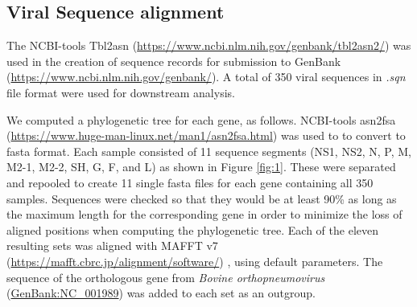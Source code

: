 \documentclass{article} %
\begin{document}
\subsection{Viral Sequence alignment}
The NCBI-tools Tbl2asn (\url{https://www.ncbi.nlm.nih.gov/genbank/tbl2asn2/})
was used in the creation of sequence records for submission to GenBank (\url{https://www.ncbi.nlm.nih.gov/genbank/}).
A total of 350 viral sequences in \textit{.sqn} file format were used for downstream analysis.

We computed a phylogenetic tree for each gene, as follows.
NCBI-tools asn2fsa (\url{https://www.huge-man-linux.net/man1/asn2fsa.html}) was used to to convert to fasta format.
Each sample consisted of 11 sequence segments
(NS1, NS2, N, P, M, M2-1, M2-2, SH, G, F, and L) as shown in 
Figure \ref{fig:1}.
These were separated and repooled to create 11 single fasta files for each gene containing all 350 samples. 
Sequences were checked so that they would be at least 90\% as long as the maximum length 
for the corresponding gene in order to minimize the loss of aligned positions when computing the phylogenetic tree. 
Each of the eleven resulting sets was aligned with MAFFT v7 (\url{https://mafft.cbrc.jp/alignment/software/})
\citep{katoh2013mafft},
using default  parameters.
The sequence of the orthologous gene from  \textit{Bovine orthopneumovirus} 
(\href{https://www.ncbi.nlm.nih.gov/nuccore/NC_001989}{GenBank:NC\_001989}) 
was added to each set as an outgroup. 
\end{document}
